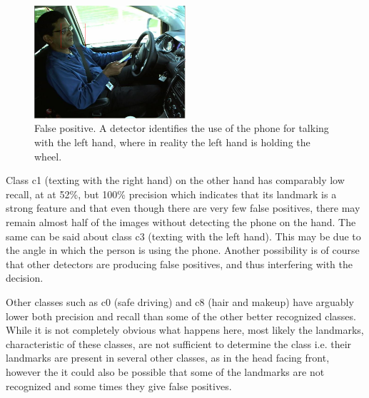 \documentclass[10pt,twocolumn,letterpaper]{article}
\begin{document}
\begin{figure}[h]
	\centering
	\includegraphics[width=0.5\textwidth]{mult_HOG/talk_phone_left}
	\caption{False positive. A detector identifies the use of the phone for talking with the left hand, where in reality the left hand is holding the wheel. }
	\label{Landmarks_false_detection}
\end{figure}

Class c1 (texting with the right hand) on the other hand has comparably low recall, at at 52\%, but 100\% precision which indicates that its landmark is a strong feature and that even though there are very few false positives, there may remain almost half of the images without detecting the phone on the hand. The same can be said about class c3 (texting with the left hand). This may be due to the angle in which the person is using the phone. Another possibility is of course that other detectors are producing false positives, and thus interfering with the decision.

Other classes such as c0 (safe driving) and c8 (hair and makeup) have arguably lower both precision and recall than some of the other better recognized classes. While it is not completely obvious what happens here, most likely the landmarks, characteristic of these classes, are not sufficient to determine the class i.e. their landmarks are present in several other classes, as in the head facing front, however the it could also be possible that some of the landmarks are not recognized and some times they give false positives.
\end{document}
